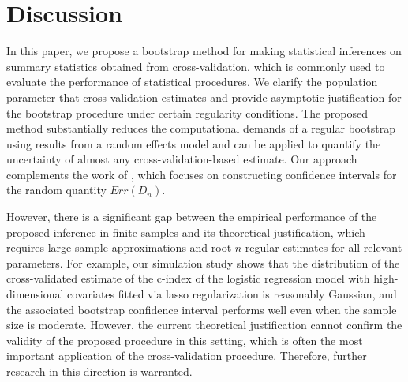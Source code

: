 \documentclass[12pt]{article}
\begin{document}

\section{Discussion}
In this paper, we propose a bootstrap method for making statistical inferences on summary statistics obtained from cross-validation, which is commonly used to evaluate the performance of statistical procedures. We clarify the population parameter that cross-validation estimates and provide asymptotic justification for the bootstrap procedure under certain regularity conditions. The proposed method substantially reduces the computational demands of a regular bootstrap using results from a random effects model and can be applied to quantify the uncertainty of almost any cross-validation-based estimate. Our approach complements the work of \cite{bates2021cross}, which focuses on constructing confidence intervals for the random quantity $Err(D_n)$.

However, there is a significant gap between the empirical performance of the proposed inference in finite samples and its theoretical justification, which requires large sample approximations and root $n$ regular estimates for all relevant parameters. For example, our simulation study shows that the distribution of the cross-validated estimate of the c-index of the logistic regression model with high-dimensional covariates fitted via lasso regularization is reasonably Gaussian, and the associated bootstrap confidence interval performs well even when the sample size is moderate. However, the current theoretical justification cannot confirm the validity of the proposed procedure in this setting, which is often the most important application of the cross-validation procedure. Therefore, further research in this direction is warranted.
\end{document}
